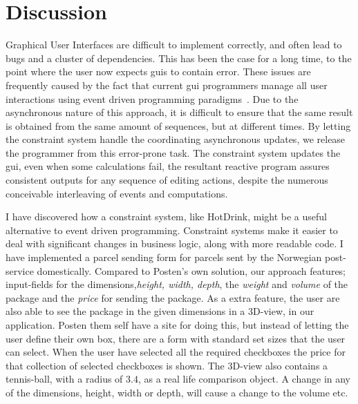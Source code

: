 \chapter{Discussion}
\label{chap:discussion}

Graphical User Interfaces are difficult to implement correctly, and often lead to bugs and a cluster of dependencies. This has been the case for a long time, to the point where the user now expects \gls{gui}s to contain error. These issues are frequently caused by the fact that current \gls{gui} programmers manage all user interactions using event driven programming paradigms~\cite{HotDrink}. Due to the asynchronous nature of this approach, it is difficult to ensure that the same result is obtained from the same amount of sequences, but at different times. By letting the constraint system handle the coordinating asynchronous updates, we release the programmer from this error-prone task. The constraint system updates the \gls{gui}, even when some calculations fail, the resultant reactive program assures consistent outputs for any sequence of editing actions, despite the numerous conceivable interleaving of events and computations.

I have discovered how a constraint system, like HotDrink, might be a useful alternative to event driven programming. Constraint systems make it easier to deal with significant changes in business logic, along with more readable code. I have implemented a parcel sending form for parcels sent by the Norwegian post-service domestically. Compared to Posten's own solution, our approach features; input-fields for the dimensions,\textit{height, width, depth}, the \textit{weight} and \textit{volume} of the package and the \textit{price} for sending the package. As a extra feature, the user are also able to see the package in the given dimensions in a 3D-view, in our application. Posten them self have a site for doing this, but instead of letting the user define their own box, there are a form with standard set sizes that the user can select. When the user have selected all the required checkboxes the price for that collection of selected checkboxes is shown. The 3D-view also contains a tennis-ball, with a radius of $3.4$, as a real life comparison object. A change in any of the dimensions, height, width or depth, will cause a change to the volume etc. 

